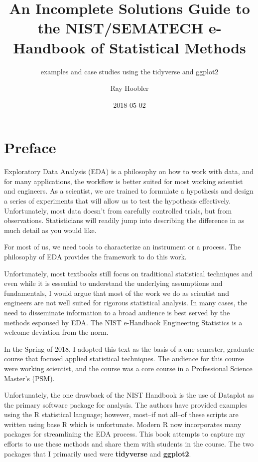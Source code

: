\documentclass[]{book}
\title{An Incomplete Solutions Guide to the NIST/SEMATECH e-Handbook of
Statistical Methods}
\subtitle{examples and case studies using the tidyverse and ggplot2}
\author{Ray Hoobler}
\date{2018-05-02}
\theoremstyle{definition}
\theoremstyle{definition}
\theoremstyle{definition}
\theoremstyle{remark}
\begin{document}
\maketitle

{
\setcounter{tocdepth}{1}
\tableofcontents
}
\hypertarget{preface}{%
\chapter*{Preface}\label{preface}}

Exploratory Data Analysis (EDA) is a philosophy on how to work with
data, and for many applications, the workflow is better suited for most
working scientist and engineers. As a scientist, we are trained to
formulate a hypothesis and design a series of experiments that will
allow us to test the hypothesis effectively. Unfortunately, most data
doesn't from carefully controlled trials, but from observations.
Statisticians will readily jump into describing the difference in as
much detail as you would like.

For most of us, we need tools to characterize an instrument or a
process. The philosophy of EDA provides the framework to do this work.

Unfortunately, most textbooks still focus on traditional statistical
techniques and even while it is essential to understand the underlying
assumptions and fundamentals, I would argue that most of the work we do
as scientist and engineers are not well suited for rigorous statistical
analysis. In many cases, the need to disseminate information to a broad
audience is best served by the methods espoused by EDA. The NIST
e-Handbook Engineering Statistics is a welcome deviation from the norm.

In the Spring of 2018, I adopted this text as the basis of a
one-semester, graduate course that focused applied statistical
techniques. The audience for this course were working scientist, and the
course was a core course in a Professional Science Master's (PSM).

Unfortunately, the one drawback of the NIST Handbook is the use of
Dataplot as the primary software package for analysis. The authors have
provided examples using the R statistical language; however, most--if
not all--of these scripts are written using base R which is unfortunate.
Modern R now incorporates many packages for streamlining the EDA
process. This book attempts to capture my efforts to use these methods
and share them with students in the course. The two packages that I
primarily used were \textbf{tidyverse} and \textbf{ggplot2}.
\end{document}
